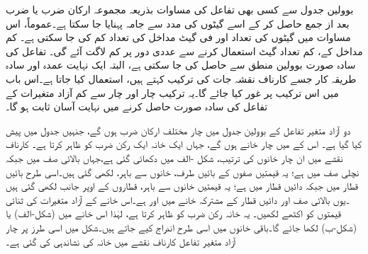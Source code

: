 بوولین جدول سے کسی بھی تفاعل کی مساوات بذریعہ مجموعہ ارکان ضرب یا  ضرب بعد از جمع حاصل کر کے اسے گیٹوں کی مدد سے جامہ پہنایا جا سکتا ہے۔عموماً، اس مساوات میں گیٹوں کی تعداد اور فی گیٹ مداخل کی تعداد کم کی جا سکتی ہے۔ کم مداخل کے، کم تعداد گیٹ استعمال کرنے سے عددی دور پر کم لاگت آئے گی۔ تفاعل کی سادہ صورت بوولین منطق سے حاصل کی جا سکتی ہے، البتہ ایک نہایت عمدہ اور سادہ طریقہ کار جسے کارناف نقشہ جات کی ترکیب کہتے ہیں، استعمال کیا جاتا ہے۔اس باب میں اس ترکیب پر غور کیا جائے گا۔یہ ترکیب چار اور چار سے کم آزاد متغیرات کے تفاعل کی سادہ صورت حاصل کرنے میں نہایت آسان ثابت ہو گا۔

دو آزاد متغیر تفاعل  کے بوولین جدول میں چار مختلف ارکان ضرب ہوں گے، جنہیں جدول  میں پیش کیا گیا ہے۔ اس کے  میں چار خانے ہوں گے، جہاں ایک خانہ ایک رکن ضرب کو ظاہر کرتا ہے۔ کارناف نقشے میں ان چار خانوں کی ترتیب، شکل -الف میں دکھائی گئی ہے،جہاں بالائی صف میں  جبکہ نچلی صف میں  ہے؛ یہ قیمتیں صفوں کے بائیں طرف، خانوں سے باہر، لکھی گئی ہیں۔اسی طرح بائیں قطار میں جبکہ دائیں قطار میں ہے؛ یہ قیمتیں خانوں سے باہر، قطاروں کے اوپر جانب لکھی گئی ہیں ۔یوں بالائی صف اور دائیں قطار کے مشترکہ خانے میں  اور  ہے۔اس خانے کے آزاد متغیرات کی ثنائی قیمتوں کو اکٹھے  لکھیں۔ یہ خانہ رکن ضرب  کو ظاہر کرتا ہے، لہٰذا اس خانے میں  (شکل-الف) یا  (شکل-ب) لکھا جائے گا۔باقی خانوں میں اسی طرح اندراج کیے جاتے ہیں۔شکل  میں اسی طرز پر چار آزاد متغیر تفاعل کارناف نقشے میں خانہ  کی نشاندہی کی گئی ہے۔

